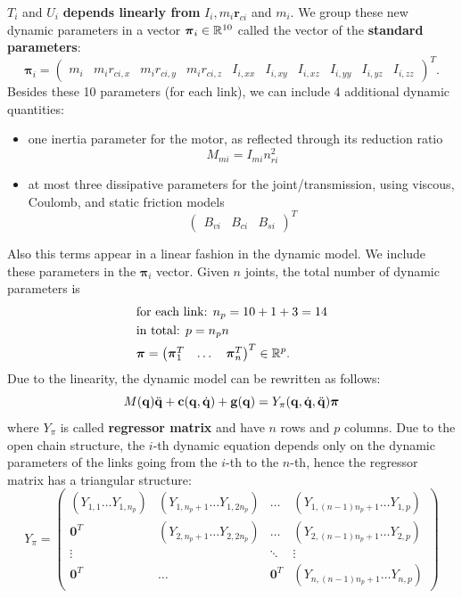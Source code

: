 \documentclass[10pt, a4paper]{report}
\newcommand{\q}{{\mathbf q}}
\begin{document}
$T_i$ and $U_i$ \textbf{depends linearly from} $I_i, m_i\mathbf r_{ci}$ and $m_i$. We group these new dynamic parameters in a vector $\boldsymbol{\pi}_i\in {\mathbb R}^{10}$ called the vector of the \textbf{standard parameters}:\begin{equation}
    \boldsymbol{\pi}_i=\begin{pmatrix}
        m_i& m_ir_{ci,x}&m_ir_{ci,y}&m_ir_{ci,z}&I_{i,xx}&I_{i,xy}&I_{i,xz}&I_{i,yy}&I_{i,yz}&I_{i,zz}
    \end{pmatrix}^T.
\end{equation}
Besides these 10 parameters (for each link), we can include 4 additional dynamic quantities:\begin{itemize}
    \item one inertia parameter for the motor, as reflected through its
reduction ratio $$M_{mi}=I_{mi}n_{ri}^2 $$
    \item at most three dissipative parameters for the joint/transmission, using
viscous, Coulomb, and static friction models
$$ \begin{pmatrix}
    B_{vi}&B_{ci}&B_{si}
\end{pmatrix}^T$$
\end{itemize}
Also this terms appear in a linear fashion in the dynamic model. We include these parameters in the $\boldsymbol{\pi}_i$ vector. Given $n$ joints, the total number of dynamic parameters is\begin{align}
    &\text{for each link: }n_p=10+1+3=14\\
    &\text{in total: }p=n_pn \\
    &\boldsymbol{\pi}=\begin{pmatrix}
        \boldsymbol{\pi}^T_1 &\dots &\boldsymbol{\pi}^T_n
    \end{pmatrix}^T\in {\mathbb R}^p.
\end{align}
Due to the linearity, the dynamic model can be rewritten as follows:\begin{equation}
    M(\q)\ddq+\mathbf c(\q,\dq)+\mathbf g(\q)=Y_\pi(\q,\dq,\ddq)\boldsymbol{\pi}
\end{equation}
where $Y_{\pi}$ is called \textbf{regressor matrix} and have $n$ rows and $p$ columns. Due to the open chain structure, the $i$-th dynamic equation depends only on the dynamic parameters of the links going from the $i$-th to the $n$-th, hence the regressor matrix has a triangular structure:\begin{equation}
    Y_\pi=\begin{pmatrix}
        (Y_{1,1}\dots Y_{1,n_p})&(Y_{1,n_p+1}\dots Y_{1,2n_p})&\dots & (Y_{1,(n-1)n_p+1}\dots Y_{1,p})\\[1.5ex] 
        \mathbf 0^T & (Y_{2,n_p+1}\dots Y_{2,2n_p})&\dots & 
        (Y_{2,(n-1)n_p+1}\dots Y_{2,p})\\[1.5ex]
        \vdots & & \ddots&\vdots \\[1.5ex]
        \mathbf 0^T & \dots & \mathbf 0^T& 
         (Y_{n,(n-1)n_p+1}\dots Y_{n,p})
    \end{pmatrix}
\end{equation}
\end{document}
